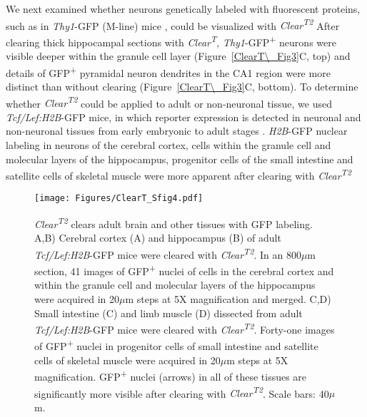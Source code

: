 We next examined whether neurons genetically labeled with fluorescent proteins, such as in \emph{Thy1}-GFP (M-line) mice \cite{feng2000imaging}, could be visualized with \emph{Clear\textsuperscript{T2}} %
After clearing thick hippocampal sections with \emph{Clear\textsuperscript{T}}, \emph{Thy1}-GFP\textsuperscript{+} neurons were visible deeper within the granule cell layer (Figure~\ref{ClearT\_Fig3}C, top) and details of GFP\textsuperscript{+} pyramidal neuron dendrites in the CA1 region were more distinct than without clearing (Figure~\ref{ClearT\_Fig3}C, bottom).
To determine whether \emph{Clear\textsuperscript{T2}} could be applied to adult or non-neuronal tissue, we used \emph{Tcf/Lef:H2B}-GFP mice, in which reporter expression is detected in neuronal and non-neuronal tissues from early embryonic to adult stages \cite{ferrer2010sensitive}.
\emph{H2B}-GFP nuclear labeling in neurons of the cerebral cortex, cells within the granule cell and molecular layers of the hippocampus, progenitor cells of the small intestine and satellite cells of skeletal muscle were more apparent after clearing with \emph{Clear\textsuperscript{T2}} %
\begin{figure}[hbtp]
    \begin{center}
        \texttt{[image: Figures/ClearT\_Sfig4.pdf]}
        \caption[\emph{Clear\textsuperscript{T2}} clears adult brain and other tissues with GFP labeling.]
        {\emph{Clear\textsuperscript{T2}} clears adult brain and other tissues with GFP labeling.
        A,B) Cerebral cortex (A) and hippocampus (B) of adult \emph{Tcf/Lef:H2B}-GFP mice were cleared with \emph{Clear\textsuperscript{T2}}.
        In an 800$\mu$m section, 41 images of GFP\textsuperscript{+} nuclei of cells in the cerebral cortex and within the granule cell and molecular layers of the hippocampus were acquired in 20$\mu$m steps at 5X magnification and merged.
        C,D) Small intestine (C) and limb muscle (D) dissected from adult \emph{Tcf/Lef:H2B}-GFP mice were cleared with \emph{Clear\textsuperscript{T2}}.
        Forty-one images of GFP\textsuperscript{+} nuclei in progenitor cells of small intestine and satellite cells of skeletal muscle were acquired in 20$\mu$m steps at 5X magnification.
        GFP\textsuperscript{+} nuclei (arrows) in all of these tissues are significantly more visible after clearing with \emph{Clear\textsuperscript{T2}}.
        Scale bars: 40$\mu$m.
        }
        \label{ClearT\_Sfig4}
    \end{center}
\end{figure}

